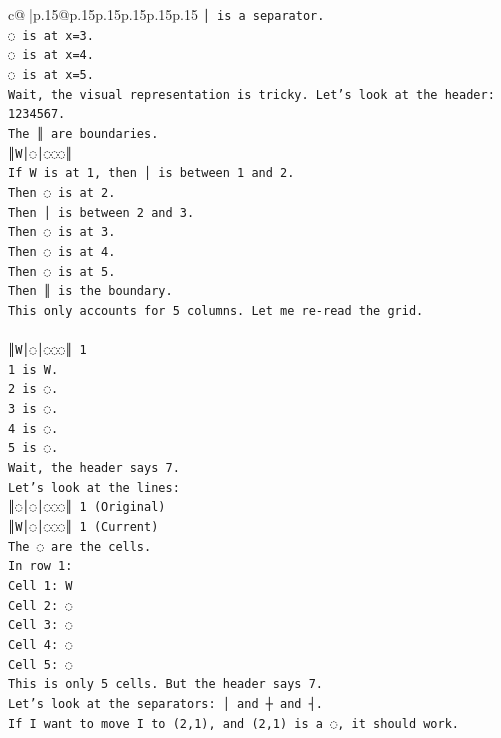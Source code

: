 \documentclass{article}
\begin{document}
{\begin{supertabular}{c@{$\;$}|p{.15\linewidth}@{}p{.15\linewidth}p{.15\linewidth}p{.15\linewidth}p{.15\linewidth}p{.15\linewidth}}
{{{\texttt{│ is a separator.} \\
\texttt{◌ is at x=3.} \\
\texttt{◌ is at x=4.} \\
\texttt{◌ is at x=5.} \\
\texttt{Wait, the visual representation is tricky. Let's look at the header: 1234567.} \\
\texttt{The ║ are boundaries.} \\
\texttt{║W│◌│◌◌◌║} \\
\texttt{If W is at 1, then │ is between 1 and 2.} \\
\texttt{Then ◌ is at 2.} \\
\texttt{Then │ is between 2 and 3.} \\
\texttt{Then ◌ is at 3.} \\
\texttt{Then ◌ is at 4.} \\
\texttt{Then ◌ is at 5.} \\
\texttt{Then ║ is the boundary.} \\
\texttt{This only accounts for 5 columns. Let me re{-}read the grid.} \\
\\ 
\texttt{║W│◌│◌◌◌║ 1} \\
\texttt{1 is W.} \\
\texttt{2 is ◌.} \\
\texttt{3 is ◌.} \\
\texttt{4 is ◌.} \\
\texttt{5 is ◌.} \\
\texttt{Wait, the header says 7.} \\
\texttt{Let's look at the lines:} \\
\texttt{║◌│◌│◌◌◌║ 1 (Original)} \\
\texttt{║W│◌│◌◌◌║ 1 (Current)} \\
\texttt{The ◌ are the cells.} \\
\texttt{In row 1:} \\
\texttt{Cell 1: W} \\
\texttt{Cell 2: ◌} \\
\texttt{Cell 3: ◌} \\
\texttt{Cell 4: ◌} \\
\texttt{Cell 5: ◌} \\
\texttt{This is only 5 cells. But the header says 7.} \\
\texttt{Let's look at the separators: │ and ┼ and ┤.} \\
\texttt{If I want to move I to (2,1), and (2,1) is a ◌, it should work.} \\
}}}
\end{supertabular}}
\end{document}
